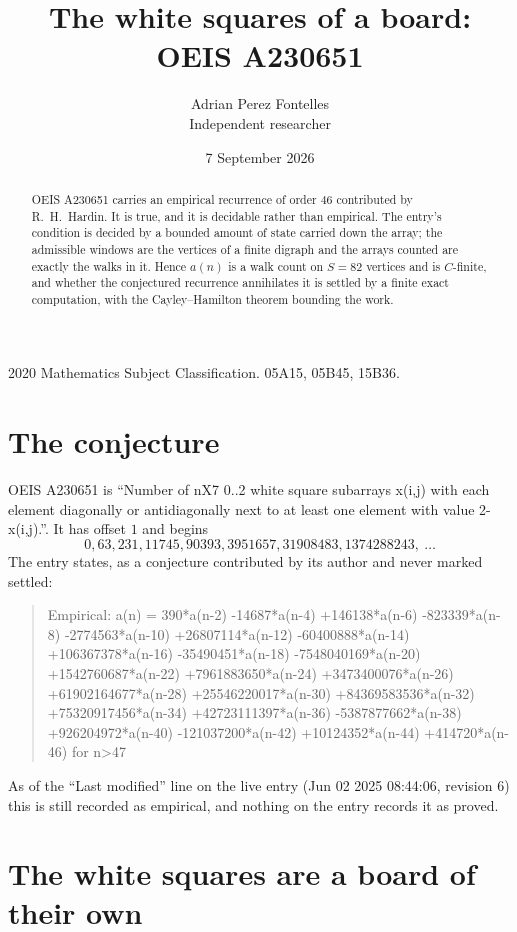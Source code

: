 \documentclass[11pt,a4paper]{article}
\title{The white squares of a board: OEIS A230651}
\author{Adrian Perez Fontelles\\ \small Independent researcher}
\date{7 September 2026}
\theoremstyle{plain}
\theoremstyle{definition}
\begin{document}
\maketitle

\begin{abstract}
OEIS A230651 carries an empirical recurrence of order $46$ contributed by R.~H.~Hardin. It is
true, and it is decidable rather than empirical. The entry's condition is decided by a bounded amount of state carried down the array; the
admissible windows are the vertices of a finite digraph and the arrays counted are exactly the
walks in it. Hence $a(n)$ is a walk count on $S=82$ vertices and is $C$-finite, and whether the
conjectured recurrence annihilates it is settled by a finite exact computation, with the
Cayley--Hamilton theorem bounding the work.
\end{abstract}

\noindent\small 2020 Mathematics Subject Classification. 05A15, 05B45, 15B36.\normalsize

\section{The conjecture}

OEIS A230651 is ``Number of nX7 0..2 white square subarrays x(i,j) with each element diagonally or antidiagonally next to at least one element with value 2-x(i,j).''. It has offset $1$ and begins
\[
0, 63, 231, 11745, 90393, 3951657, 31908483, 1374288243,\ \dots
\]
The entry states, as a conjecture contributed by its author and never marked settled:
\begin{quote}
Empirical: a(n) = 390*a(n-2) -14687*a(n-4) +146138*a(n-6) -823339*a(n-8) -2774563*a(n-10) +26807114*a(n-12) -60400888*a(n-14) +106367378*a(n-16) -35490451*a(n-18) -7548040169*a(n-20) +1542760687*a(n-22) +7961883650*a(n-24) +3473400076*a(n-26) +61902164677*a(n-28) +25546220017*a(n-30) +84369583536*a(n-32) +75320917456*a(n-34) +42723111397*a(n-36) -5387877662*a(n-38) +926204972*a(n-40) -121037200*a(n-42) +10124352*a(n-44) +414720*a(n-46) for n>47
\end{quote}
As of the ``Last modified'' line on the live entry (Jun 02 2025 08:44:06, revision 6) this is still
recorded as empirical, and nothing on the entry records it as proved.

\section{The white squares are a board of their own}
\end{document}
